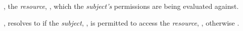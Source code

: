 \begin{interface}
\begin{functions}
\begin{parameters}
        \item {}, the \emph{resource}, , which the \emph{subject's} permissions are being evaluated
          against.
      \end{parameters}

      \begin{returns}
        \item {}, resolves to  if the
          \emph{subject}, , is permitted to access the
          \emph{resource}, , otherwise .
      \end{returns}
  \end{functions}
\end{interface}
